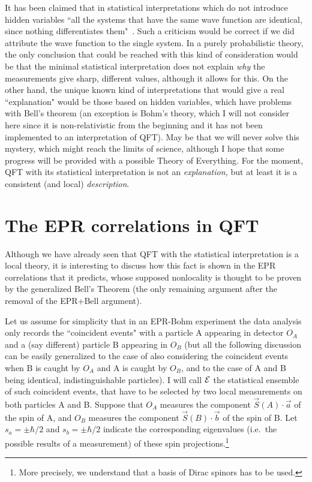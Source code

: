 \documentclass[published]{JHEP3}
\begin{document}
It has been claimed that in statistical interpretations which do
not introduce hidden variables ``all the systems that have the
same wave function are identical, since nothing differentiates
them"~\cite{dEspagnat}. Such a criticism would be correct if we
did attribute the wave function to the single system. In a purely
probabilistic theory, the only conclusion that could be reached
with this kind of consideration would be that the minimal
statistical interpretation does not explain \emph{why} the
measurements give sharp, different values, although it allows for
this. On the other hand, the unique known kind of interpretations
that would give a real ``explanation" would be those based on
hidden variables, which have problems with Bell's theorem (an
exception is Bohm's theory, which I will not consider here since
it is non-relativistic from the beginning and it has not been
implemented to an interpretation of QFT). May be that we will
never solve this mystery, which might reach the limits of science,
although I hope that some progress will be provided with a
possible Theory of Everything. For the moment, QFT with its
statistical interpretation is not an \emph{explanation,} but at
least it is a consistent (and local) \emph{description}.


\section{The EPR correlations in QFT}

Although we have already seen that QFT with the statistical
interpretation is a local theory, it is interesting to discuss how
this fact is shown in the EPR correlations that it predicts, whose
supposed nonlocality is thought to be proven by the generalized
Bell's Theorem (the only remaining argument after the removal of
the EPR+Bell argument).

Let us assume for simplicity that in an EPR-Bohm experiment the data
analysis only records the ``coincident events" with a particle A
appearing in detector $O_A$ and a (say different) particle B appearing
in $O_B$ (but all the following discussion can be easily generalized
to the case of also considering the coincident events when B is caught
by $O_A$ and A is caught by $O_B$, and to the case of A and B being
identical, indistinguishable particles). I will call ${\cal E}$ the
statistical ensemble of such coincident events, that have to be
selected by two local measurements on both particles A and B.  Suppose
that $O_A$ measures the component $\vec S(A)\cdot\vec a$ of the spin
of A, and $O_B$ measures the component $\vec S(B)\cdot\vec b$ of the
spin of B. Let $s_a=\pm\hbar/2$ and $s_b=\pm\hbar/2$ indicate the
corresponding eigenvalues (i.e.\ the possible results of a
measurement) of these spin projections.\footnote{More precisely, we
understand that a basis of Dirac spinors has to be used.}
\end{document}
